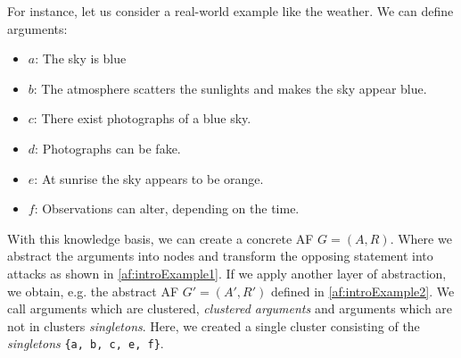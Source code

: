 For instance, let us consider a real-world example like the weather. We can define arguments:

\begin{itemize}
    \item $a$: The sky is blue
    \item $b$: The atmosphere scatters the sunlights and makes the sky appear blue. 
    \item $c$: There exist photographs of a blue sky. 
    \item $d$: Photographs can be fake.
    \item $e$: At sunrise the sky appears to be orange. 
    \item $f$: Observations can alter, depending on the time.
\end{itemize}

With this knowledge basis, we can create a concrete AF $G = (A, R)$. Where we abstract the arguments into nodes and transform the opposing statement into attacks as shown in \ref{af:introExample1}. If we apply another layer of abstraction, we obtain, e.g. the abstract AF $G' = (A', R')$ defined in \ref{af:introExample2}. We call arguments which are clustered, \emph{clustered arguments} and arguments which are not in clusters \emph{singletons}. Here, we created a single cluster consisting of the \emph{singletons} \texttt{\{a, b, c, e, f\}}.



